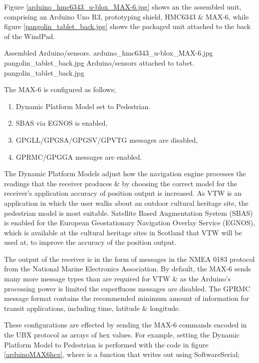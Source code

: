 Figure \ref{arduino_hmc6343_u-blox_MAX-6.jpg} shows an the assembled unit, comprising an Arduino Uno R3, prototyping shield, HMC6343 \& MAX-6, while figure \ref{pangolin_tablet_back.jpg} shows the packaged unit attached to the back of the WindPad.

 {Assembled Arduino/sensors.} {arduino_hmc6343_u-blox_MAX-6.jpg}
       {pangolin_tablet_back.jpg} {Arduino/sensors attached to tabet.} {pangolin_tablet_back.jpg}
       

The MAX-6 is configured as follows;

\begin{enumerate}
	\item Dynamic Platform Model set to Pedestrian.
	\item SBAS via EGNOS is enabled,
	\item GPGLL/GPGSA/GPGSV/GPVTG messages are disabled,
	\item GPRMC/GPGGA messages are enabled.
\end{enumerate}

The Dynamic Platform Models adjust how the navigation engine processes the readings that the receiver produces \& by choosing the correct model for the receiver's application accuracy of position output is increased. As VTW is an application in which the user walks about an outdoor cultural heritage site, the pedestrian model is most suitable. Satellite Based Augmentation System (SBAS) is enabled for the European Geostationary Navigation Overlay Service (EGNOS), which is available at the cultural heritage sites in Scotland that VTW will be used at, to improve the accuracy of the position output.

The output of the receiver is in the form of messages in the NMEA 0183 protocol from the National Marine Electronics Association. By default, the MAX-6 sends many more message types than are required for VTW \& as the Arduino's processing power is limited the superfluous messages are disabled. The GPRMC message format contains the recommended minimum amount of information for transit applications, including time, latitude \& longitude.

These configurations are effected by sending the MAX-6 commands encoded in the UBX protocol as arrays of hex values. For example, setting the Dynamic Platform Model to Pedestrian is performed with the code in figure \ref{arduinoMAX6hex}, where  is a function that writes out using SoftwareSerial;

